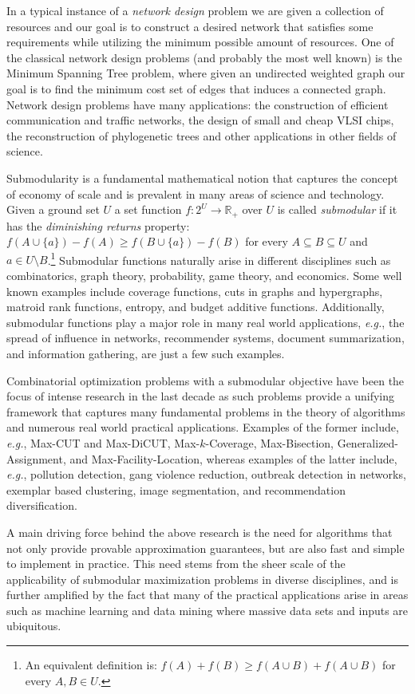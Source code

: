 In a typical instance of a \emph{network design} problem we are given a collection of resources and our goal is to construct a desired network that satisfies some requirements while utilizing the minimum possible amount of resources.
One of the classical network design problems (and probably the most well known) is the Minimum Spanning Tree problem, where given an undirected weighted graph our goal is to find the minimum cost set of edges that induces a connected graph.
Network design problems have many applications: the construction of efficient communication and traffic networks, the design of small and cheap VLSI chips, the reconstruction of phylogenetic trees and other applications in other fields of science.

Submodularity is a fundamental mathematical notion that captures the concept of economy of scale and is prevalent in many areas of science and technology.
Given a ground set $U$ a set function $f:2^U \to \mathbb{R}_+$ over $U$ is called \emph{submodular} if it has the \emph{diminishing returns} property:
$f(A \cup \{a\}) - f(A) \geq f(B \cup \{a\}) - f(B)$ for every $A \subseteq B \subseteq U$ and $a \in U \setminus B$.\footnote{
    An equivalent definition is: $f(A) + f(B) \geq f(A \cup B) + f(A \cup B)$ for every $A,B \in U$.
}
Submodular functions naturally arise in different disciplines such as combinatorics, graph theory, probability, game theory, and economics.
Some well known examples include coverage functions, cuts in graphs and hypergraphs, matroid rank functions, entropy, and budget additive functions.
Additionally, submodular functions play a major role in many real world applications, {\em e.g.}, the spread of influence in networks, recommender systems, document summarization, and information gathering, are just a few such examples.

Combinatorial optimization problems with a submodular objective have been the focus of intense research in the last decade as such problems provide a unifying framework that captures many fundamental problems in the theory of algorithms and numerous real world practical applications.
Examples of the former include, {\em e.g.}, Max-CUT and Max-DiCUT, Max-$k$-Coverage, Max-Bisection, Generalized-Assignment, and Max-Facility-Location, whereas examples of the latter include, {\em e.g.}, pollution detection, gang violence reduction, outbreak detection in networks, exemplar based clustering, image segmentation, and recommendation diversification.

A main driving force behind the above research is the need for algorithms that not only provide provable approximation guarantees, but are also fast and  simple to implement in practice.
This need stems from the sheer scale of the applicability of submodular maximization problems in diverse disciplines, and is further amplified by the fact that many of the practical applications arise in areas such as machine learning and data mining where massive data sets and inputs are ubiquitous.

